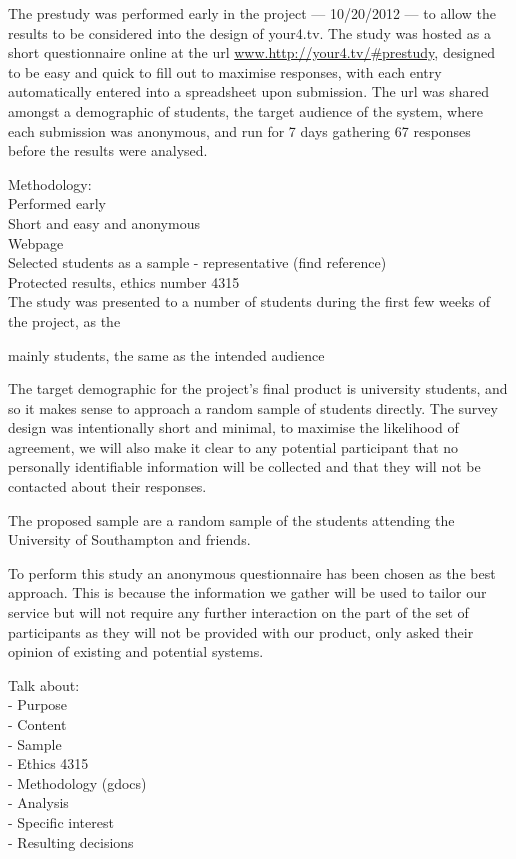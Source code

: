 The prestudy was performed early in the project --- 10/20/2012 --- to allow the results to be considered into the design of your4.tv. The study was hosted as a short questionnaire online at the url \url{www.http://your4.tv/#prestudy}, designed to be easy and quick to fill out to maximise responses, with each entry automatically entered into a spreadsheet upon submission. The url was shared amongst a demographic of students, the target audience of the system, where each submission was anonymous, and run for 7 days gathering 67 responses before the results were analysed.

Methodology:\\
Performed early\\
Short and easy and anonymous\\
Webpage\\
Selected students as a sample - representative (find reference)\\
Protected results, ethics number 4315\\



The study was presented to a number of students during the first few weeks of the project, as the 

mainly students, the same as the intended audience


The target demographic for the project's final product is university students, and so it makes sense to approach a random sample of students directly. The survey design was intentionally short and minimal, to maximise the likelihood of agreement, we will also make it clear to any potential participant that no personally identifiable information will be collected and that they will not be contacted about their responses. %

The proposed sample are a random sample of the students attending the University of Southampton and friends.


To perform this study an anonymous questionnaire has been chosen as the best approach. This is because the information we gather will be used to tailor our service but will not require any further interaction on the part of the set of participants as they will not be provided with our product, only asked their opinion of existing and potential systems.



Talk about:\\
 - Purpose\\
 - Content\\
 - Sample\\
 - Ethics 4315\\
 - Methodology (gdocs)\\
 - Analysis\\
  - Specific interest\\
  - Resulting decisions\\



